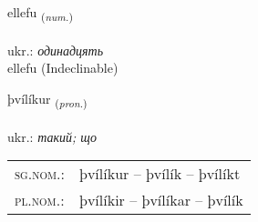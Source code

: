 \documentclass[frontgrid, backgrid]{flacards}\usepackage[]{graphicx}\usepackage[]{xcolor}
\begin{document}

\renewcommand{\flhead}{\vskip5pt \fboxsep=0pt {\small\bfseries\footnotesize Töluorð | чисельник}}
\renewcommand{\fcfoot}{\vskip5pt \fboxsep=0pt \hspace{2pt}{\small\bfseries\footnotesize 3K}}

\renewcommand{\blhead}{\vskip5pt {\small\bfseries\footnotesize Töluorð | чисельник }}
\renewcommand{\bcfoot}{\vskip5pt \hspace{2pt}{\small\bfseries\footnotesize 3K}}


{ellefu \small{\textsubscript{(\textit{num.})}} \\[1ex]
\textphonetic{[ɛtlɛvʏ]} \\
ukr.: \emph{одинадцять} \\  [2ex]
ellefu (Indeclinable)}

\renewcommand{\flhead}{\vskip5pt \fboxsep=0pt {\small\bfseries\footnotesize Fornafn | займенник}}
\renewcommand{\fcfoot}{\vskip5pt \fboxsep=0pt \hspace{2pt}{\small\bfseries\footnotesize 3K}}

\renewcommand{\blhead}{\vskip5pt {\small\bfseries\footnotesize Fornafn | займенник }}
\renewcommand{\bcfoot}{\vskip5pt \hspace{2pt}{\small\bfseries\footnotesize 3K}}


{þvílíkur \small{\textsubscript{(\textit{pron.})}} \\[1ex] %
\textphonetic{[θviːlikʏr]} \\
ukr.: \emph{такий; що} \\  [2ex]
\renewcommand*{\arraystretch}{0.8}
\begin{tabular}{ll}
\textsc{sg.nom.}: & þvílíkur  --  þvílík -- þvílíkt \\ 
\textsc{pl.nom.}: & þvílíkir -- þvílíkar -- þvílík
\end{tabular}
}

\renewcommand{\flhead}{\vskip5pt \fboxsep=0pt {\small\bfseries\footnotesize Sagnorð | дієслово}}
\renewcommand{\fcfoot}{\vskip5pt \fboxsep=0pt \hspace{2pt}{\small\bfseries\footnotesize 3K}}
\end{document}
